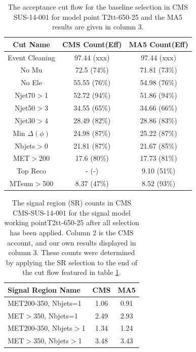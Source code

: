 \begin{table}
    \begin{centering}
    \begin{tabular}{  c | c | c  }
    \hline
    Cut Name & CMS Count(Eff) & MA5 Count(Eff)\\
    \hline
        Event Cleaning & 97.44 (xxx) & 97.44 (xxx)\\
    No Mu & 72.5 (74\%) & 71.81 (73\%)\\
    No Ele & 55.55 (76\%) & 54.98 (76\%)\\
    Njet70$>$1 & 52.72 (94\%) & 51.86 (94\%)\\
    Njet50$>$3 & 34.55 (65\%) & 34.66 (66\%)\\
    Njet30$>$4 & 28.49 (82\%) & 28.86 (83\%)\\
    Min $\Delta(\phi)$ & 24.98 (87\%) & 25.22 (87\%)\\
    Nbjets$>$0 & 21.81 (87\%) & 21.67 (85\%)\\
    MET$>$200 & 17.6 (80\%) & 17.73 (81\%)\\
    Top Reco & - (-) & 9.10 (51\%)\\
    MTsum$>$500 & 8.37 (47\%) & 8.52 (93\%)\\
\hline
    \end{tabular}
    \caption{The acceptance cut flow for the baseline selection in CMS SUS-14-001 for
    model point T2tt-650-25 and the MA5 results are given in column 3.}
    \label{table:T2tt-650-25}
    \end{centering}
    \end{table}

    \begin{table}
    \begin{centering}
    \begin{tabular}{  l | c | c  }
    \hline
    Signal Region Name & CMS & MA5\\
    \hline
    MET200-350,  Nbjets=1 & 1.06 & 0.91\\ 
 \hline 
MET$>$350,  Nbjets=1 & 2.49 & 2.93\\ 
 \hline 
MET200-350,  Nbjets$>$1 & 1.34 & 1.24\\ 
 \hline 
MET$>$350,  Nbjets$>$1 & 3.48 & 3.43\\ 
 \hline 
\hline
    \end{tabular}
    \caption{The signal region (SR) counts in CMS CMS-SUS-14-001 for
    the signal model working pointT2tt-650-25 after all selection has been applied. Column 2 is the CMS account,
    and our own results displayed in column 3. These counts were determined by applying the SR selection to the end of the cut flow featured in table \ref{table:T2tt-650-25}.}
    \end{centering}
    \end{table}


